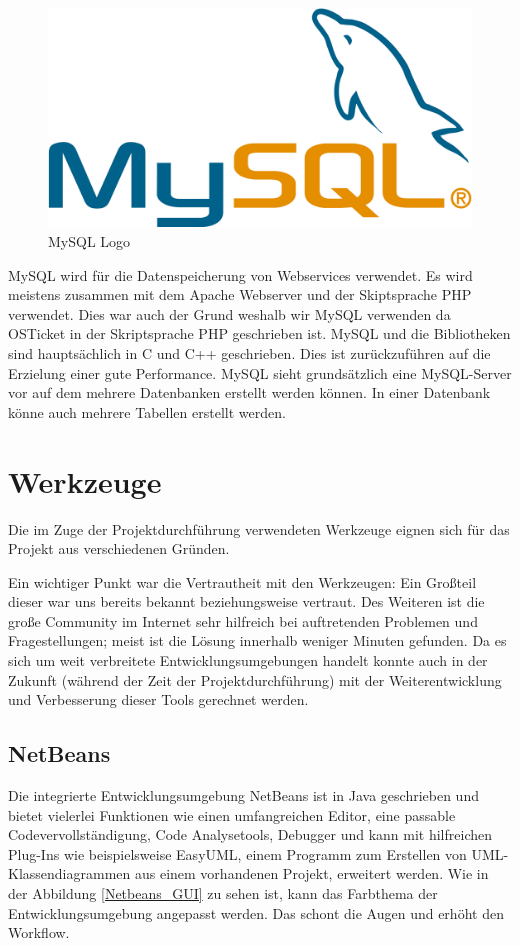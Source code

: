 	\begin{figure}[h]
		\centering
		\includegraphics[scale=.35]{figures/mysql_logo.png}
		\caption{MySQL Logo}
		\label{MySQL_Logo}
	\end{figure}
	
	MySQL wird für die Datenspeicherung von Webservices verwendet. Es wird meistens zusammen mit dem Apache Webserver und der Skiptsprache PHP verwendet. Dies war auch der Grund weshalb wir MySQL verwenden da OSTicket in der Skriptsprache PHP geschrieben ist.
	MySQL und die Bibliotheken sind hauptsächlich in C und C++ geschrieben. Dies ist zurückzuführen auf die Erzielung einer gute Performance.
	MySQL sieht grundsätzlich eine MySQL-Server vor auf dem mehrere Datenbanken erstellt werden können. In einer Datenbank könne auch mehrere Tabellen erstellt werden.
	

	\section{Werkzeuge}
	Die im Zuge der Projektdurchführung verwendeten Werkzeuge eignen sich für das Projekt aus verschiedenen Gründen.
	
	Ein wichtiger Punkt war die Vertrautheit mit den Werkzeugen: Ein Großteil dieser war uns bereits bekannt beziehungsweise vertraut. Des Weiteren ist die große Community im Internet sehr hilfreich bei auftretenden Problemen und Fragestellungen; meist ist die Lösung innerhalb weniger Minuten gefunden. Da es sich um weit verbreitete Entwicklungsumgebungen handelt konnte auch in der Zukunft (während der Zeit der Projektdurchführung) mit der Weiterentwicklung und Verbesserung dieser Tools gerechnet werden.
	
	\subsection{NetBeans}
	Die integrierte Entwicklungsumgebung NetBeans ist in Java geschrieben und bietet vielerlei Funktionen wie einen umfangreichen Editor, eine passable Codevervollständigung, Code Analysetools, Debugger und kann mit hilfreichen Plug-Ins wie beispielsweise EasyUML, einem Programm zum Erstellen von UML-Klassendiagrammen aus einem vorhandenen Projekt, erweitert werden. Wie in der Abbildung \ref{Netbeans_GUI} zu sehen ist, kann das Farbthema der Entwicklungsumgebung angepasst werden. Das schont die Augen und erhöht den Workflow.
	

